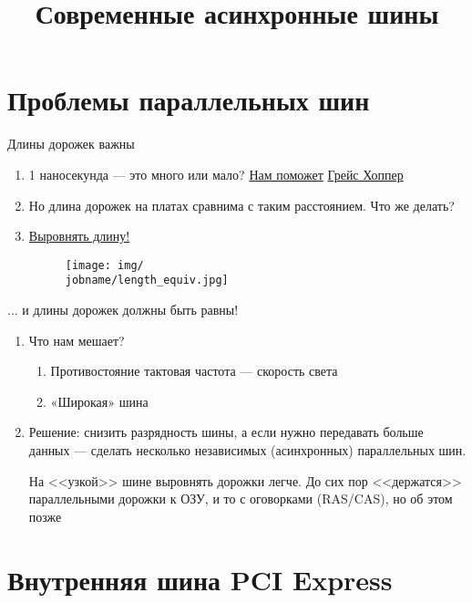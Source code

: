 \documentclass[xetex,aspectratio=43]{beamer}
\title[Современные асинхронные шины]{Современные асинхронные шины}
\begin{document}
\titleslide

\tocslide

\section{Проблемы параллельных шин}

\begin{frame}{Длины дорожек важны}
    \begin{enumerate}
        \item 1 наносекунда --- это много или мало? \href{https://youtu.be/gYqF6-h9Cvg}{Нам поможет} \href{https://en.wikipedia.org/wiki/Grace_Hopper}{Грейс Хоппер}
        \pause
        \item Но длина дорожек на платах сравнима с таким расстоянием. Что же делать?
        \pause
        \item \href{https://www.electromaker.io/blog/article/7-ways-to-quickly-judge-the-quality-of-your-printed-circuit-board-pcb-design}{Выровнять длину!}
        \begin{figure}
            \texttt{[image: img/\\jobname/length\_equiv.jpg]}
        \end{figure}
    \end{enumerate}
\end{frame}


\begin{frame}{... и длины дорожек должны быть равны!}
    \begin{enumerate}
        \item Что нам мешает?
        \begin{enumerate}
            \item Противостояние тактовая частота --- скорость света
            \item «Широкая» шина
        \end{enumerate}
        \pause
        \item \alert{Решение: снизить разрядность шины, а если нужно передавать больше данных --- сделать несколько независимых (асинхронных) параллельных шин.}

        На <<узкой>> шине выровнять дорожки легче. До сих пор <<держатся>> параллельными дорожки к ОЗУ, и то с оговорками (RAS/CAS), но об этом позже
    \end{enumerate}
\end{frame}

\section{Внутренняя шина PCI Express}
\end{document}
